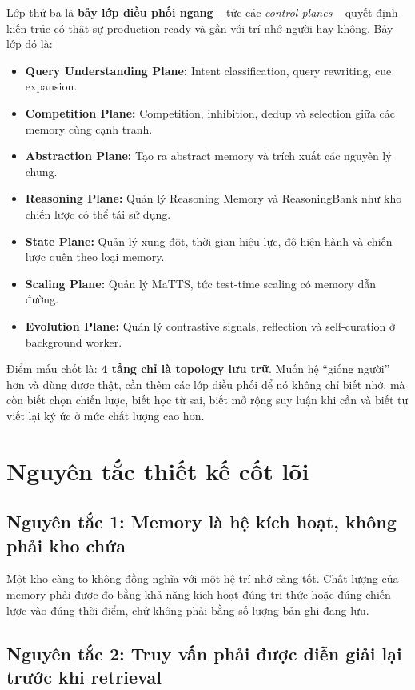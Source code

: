 \documentclass[a4paper,12pt]{article}
\begin{document}
Lớp thứ ba là \textbf{bảy lớp điều phối ngang} -- tức các \emph{control planes} -- quyết định kiến trúc có thật sự production-ready và gần với trí nhớ người hay không. Bảy lớp đó là:
\begin{itemize}
    \item \textbf{Query Understanding Plane:} Intent classification, query rewriting, cue expansion.
    \item \textbf{Competition Plane:} Competition, inhibition, dedup và selection giữa các memory cùng cạnh tranh.
    \item \textbf{Abstraction Plane:} Tạo ra abstract memory và trích xuất các nguyên lý chung.
    \item \textbf{Reasoning Plane:} Quản lý Reasoning Memory và ReasoningBank như kho chiến lược có thể tái sử dụng.
    \item \textbf{State Plane:} Quản lý xung đột, thời gian hiệu lực, độ hiện hành và chiến lược quên theo loại memory.
    \item \textbf{Scaling Plane:} Quản lý MaTTS, tức test-time scaling có memory dẫn đường.
    \item \textbf{Evolution Plane:} Quản lý contrastive signals, reflection và self-curation ở background worker.
\end{itemize}

Điểm mấu chốt là: \textbf{4 tầng chỉ là topology lưu trữ}. Muốn hệ ``giống người'' hơn và dùng được thật, cần thêm các lớp điều phối để nó không chỉ biết nhớ, mà còn biết chọn chiến lược, biết học từ sai, biết mở rộng suy luận khi cần và biết tự viết lại ký ức ở mức chất lượng cao hơn.

\section{Nguyên tắc thiết kế cốt lõi}

\subsection*{Nguyên tắc 1: Memory là hệ kích hoạt, không phải kho chứa}

Một kho càng to không đồng nghĩa với một hệ trí nhớ càng tốt. Chất lượng của memory phải được đo bằng khả năng kích hoạt đúng tri thức hoặc đúng chiến lược vào đúng thời điểm, chứ không phải bằng số lượng bản ghi đang lưu.

\subsection*{Nguyên tắc 2: Truy vấn phải được diễn giải lại trước khi retrieval}
\end{document}
